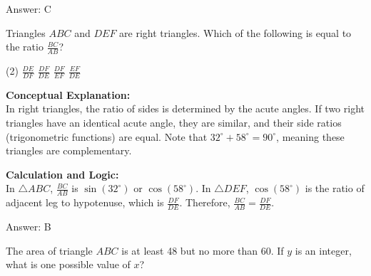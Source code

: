 \documentclass[11pt,paper=a4,answers]{exam}
\begin{document}
\begin{questions}
\begin{solution}
Answer: \colorbox{yellow!100}{C}
\end{solution}

\vspace{60pt}

\question
\begin{center}
\end{center}
Triangles $ABC$ and $DEF$ are right triangles. Which of the following is equal to the ratio $\frac{BC}{AB}$?
\begin{tasks}(2)
    \task $\frac{DE}{DF}$
    \task $\frac{DF}{DE}$
    \task $\frac{DF}{EF}$
    \task $\frac{EF}{DE}$
\end{tasks}

\begin{solution}
\textbf{Conceptual Explanation:} \\
In right triangles, the ratio of sides is determined by the acute angles. If two right triangles have an identical acute angle, they are similar, and their side ratios (trigonometric functions) are equal. Note that $32^\circ + 58^\circ = 90^\circ$, meaning these triangles are complementary.

\vspace{30pt}

\textbf{Calculation and Logic:} \\
In $\triangle ABC$, $\frac{BC}{AB}$ is $\sin(32^\circ)$ or $\cos(58^\circ)$. In $\triangle DEF$, $\cos(58^\circ)$ is the ratio of adjacent leg to hypotenuse, which is $\frac{DF}{DE}$. Therefore, $\frac{BC}{AB} = \frac{DF}{DE}$.

\vspace{30pt}

Answer: \colorbox{yellow!100}{B}
\end{solution}

\vspace{60pt}

\question
\begin{center}
\end{center}
The area of triangle $ABC$ is at least 48 but no more than 60. If $y$ is an integer, what is one possible value of $x$?


\end{questions}
\end{document}
